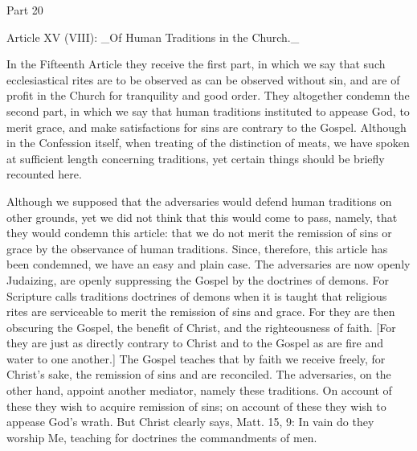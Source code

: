 Part 20


Article XV (VIII): _Of Human Traditions in the Church._

In the Fifteenth Article they receive the first part, in which we say
that such ecclesiastical rites are to be observed as can be observed
without sin, and are of profit in the Church for tranquility and good
order.  They altogether condemn the second part, in which we say that
human traditions instituted to appease God, to merit grace, and make
satisfactions for sins are contrary to the Gospel.  Although in the
Confession itself, when treating of the distinction of meats, we have
spoken at sufficient length concerning traditions, yet certain things
should be briefly recounted here.

Although we supposed that the adversaries would defend human
traditions on other grounds, yet we did not think that this would
come to pass, namely, that they would condemn this article: that we
do not merit the remission of sins or grace by the observance of
human traditions.  Since, therefore, this article has been condemned,
we have an easy and plain case.  The adversaries are now openly
Judaizing, are openly suppressing the Gospel by the doctrines of
demons.  For Scripture calls traditions doctrines of demons when it
is taught that religious rites are serviceable to merit the remission
of sins and grace.  For they are then obscuring the Gospel, the
benefit of Christ, and the righteousness of faith.  [For they are
just as directly contrary to Christ and to the Gospel as are fire and
water to one another.] The Gospel teaches that by faith we receive
freely, for Christ's sake, the remission of sins and are reconciled.
The adversaries, on the other hand, appoint another mediator, namely
these traditions.  On account of these they wish to acquire remission
of sins; on account of these they wish to appease God's wrath.  But
Christ clearly says, Matt. 15, 9: In vain do they worship Me,
teaching for doctrines the commandments of men.

